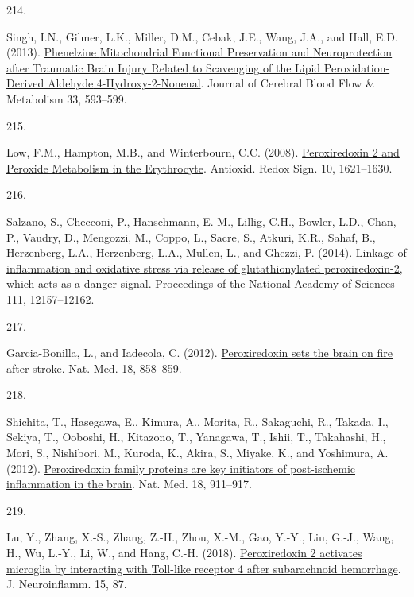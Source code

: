\documentclass[
]{article}
\newlength{\cslhangindent}
\newlength{\csllabelwidth}
\newlength{\cslentryspacingunit} %
\newenvironment{CSLReferences}[2] %
 {%
  \setlength{\parindent}{0pt}
  \ifodd #1
  \let\oldpar\par
  \def\par{\hangindent=\cslhangindent\oldpar}
  \fi
  \setlength{\parskip}{#2\cslentryspacingunit}
 }%
 {}
\newcommand{\CSLLeftMargin}[1]{\parbox[t]{\csllabelwidth}{#1}}
\newcommand{\CSLRightInline}[1]{\parbox[t]{\linewidth - \csllabelwidth}{#1}\break}
\begin{document}
\begin{CSLReferences}{0}{0}
\leavevmode{}%
\CSLLeftMargin{214. }
\CSLRightInline{Singh, I.N., Gilmer, L.K., Miller, D.M., Cebak, J.E., Wang, J.A., and Hall, E.D. (2013). \href{https://doi.org/10.1038/jcbfm.2012.211}{Phenelzine {Mitochondrial Functional Preservation} and {Neuroprotection} after {Traumatic Brain Injury Related} to {Scavenging} of the {Lipid Peroxidation-Derived Aldehyde} 4-{Hydroxy-2-Nonenal}}. Journal of Cerebral Blood Flow \& Metabolism 33, 593--599.}

\leavevmode{}%
\CSLLeftMargin{215. }
\CSLRightInline{Low, F.M., Hampton, M.B., and Winterbourn, C.C. (2008). \href{https://doi.org/10.1089/ars.2008.2081}{Peroxiredoxin 2 and {Peroxide Metabolism} in the {Erythrocyte}}. Antioxid. Redox Sign. 10, 1621--1630.}

\leavevmode{}%
\CSLLeftMargin{216. }
\CSLRightInline{Salzano, S., Checconi, P., Hanschmann, E.-M., Lillig, C.H., Bowler, L.D., Chan, P., Vaudry, D., Mengozzi, M., Coppo, L., Sacre, S., Atkuri, K.R., Sahaf, B., Herzenberg, L.A., Herzenberg, L.A., Mullen, L., and Ghezzi, P. (2014). \href{https://doi.org/10.1073/pnas.1401712111}{Linkage of inflammation and oxidative stress via release of glutathionylated peroxiredoxin-2, which acts as a danger signal}. Proceedings of the National Academy of Sciences 111, 12157--12162.}

\leavevmode{}%
\CSLLeftMargin{217. }
\CSLRightInline{Garcia-Bonilla, L., and Iadecola, C. (2012). \href{https://doi.org/10.1038/nm.2797}{Peroxiredoxin sets the brain on fire after stroke}. Nat. Med. 18, 858--859.}

\leavevmode{}%
\CSLLeftMargin{218. }
\CSLRightInline{Shichita, T., Hasegawa, E., Kimura, A., Morita, R., Sakaguchi, R., Takada, I., Sekiya, T., Ooboshi, H., Kitazono, T., Yanagawa, T., Ishii, T., Takahashi, H., Mori, S., Nishibori, M., Kuroda, K., Akira, S., Miyake, K., and Yoshimura, A. (2012). \href{https://doi.org/10.1038/nm.2749}{Peroxiredoxin family proteins are key initiators of post-ischemic inflammation in the brain}. Nat. Med. 18, 911--917.}

\leavevmode{}%
\CSLLeftMargin{219. }
\CSLRightInline{Lu, Y., Zhang, X.-S., Zhang, Z.-H., Zhou, X.-M., Gao, Y.-Y., Liu, G.-J., Wang, H., Wu, L.-Y., Li, W., and Hang, C.-H. (2018). \href{https://doi.org/10.1186/s12974-018-1118-4}{Peroxiredoxin 2 activates microglia by interacting with {Toll-like} receptor 4 after subarachnoid hemorrhage}. J. Neuroinflamm. 15, 87.}


\end{CSLReferences}
\end{document}
